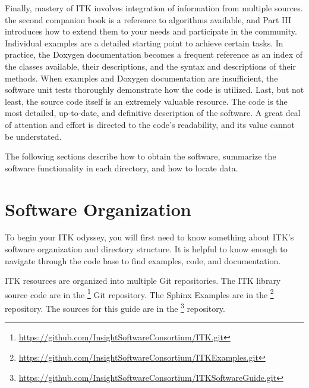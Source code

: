 Finally, mastery of ITK involves integration of information from multiple
sources. the second companion book is a reference to algorithms available, and
Part III introduces how to extend them to your needs and participate in the
community. Individual examples are a detailed starting point to achieve
certain tasks.  In practice, the Doxygen documentation becomes a frequent
reference as an index of the classes available, their descriptions, and the
syntax and descriptions of their methods. When examples and Doxygen
documentation are insufficient, the software unit tests thoroughly demonstrate
how the code is utilized. Last, but not least, the source code itself
is an extremely valuable resource. The code is the most detailed, up-to-date, and
definitive description of the software. A great deal of attention and effort
is directed to the code's readability, and its value cannot be understated.

The following sections describe how to obtain the software, summarize the
software functionality in each directory, and how to locate data.

\section{Software Organization}
\label{sec:SoftwareOrganization}

To begin your ITK odyssey, you will first need to know something about
ITK's software organization and directory structure. It is helpful to
know enough to navigate through the code base to find examples, code,
and documentation.

ITK resources are organized into multiple Git repositories. The ITK library source
code are in the \footnote{\url{https://github.com/InsightSoftwareConsortium/ITK.git}} Git
repository. The Sphinx Examples are in the
\footnote{\url{https://github.com/InsightSoftwareConsortium/ITKExamples.git}} repository.
The sources for this guide are in the
\footnote{\url{https://github.com/InsightSoftwareConsortium/ITKSoftwareGuide.git}}
repository.


